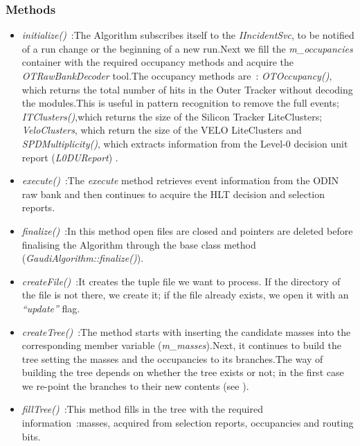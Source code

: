 \subsubsection{\textbf{Methods}}
\begin{itemize}
\item \textit{initialize()}~:The Algorithm subscribes itself to the \textit{IIncidentSvc}, to be notified of a run change or the beginning of a new run.Next we fill the \textit{m\_occupancies} container with the required occupancy methods and acquire the \textit{OTRawBankDecoder} tool.The occupancy methods are~: \textit{OTOccupancy()}, which returns the total number of hits in the Outer Tracker without decoding the modules.This is useful in pattern recognition to remove the full events; \textit{ITClusters()},which returns the size of the Silicon Tracker LiteClusters; \textit{VeloClusters}, which return the size of the VELO LiteClusters and \textit{SPDMultiplicity()}, which extracts information from the Level-0 decision unit report (\textit{L0DUReport}) .\par
\item \textit{execute()}~:The \textit{execute} method retrieves event information from the ODIN raw bank and then continues to acquire the HLT decision and selection reports.\par
\item \textit{finalize()}~:In this method open files are closed and pointers are deleted before finalising the Algorithm through the base class method (\textit{GaudiAlgorithm::finalize()}).\par
\item \textit{createFile()}~:It creates the tuple file we want to process. If the directory of the file is not there, we create it; if the file already exists, we open it with an \textit{``update''} flag.\par
\item \textit{createTree()}~:The method starts with inserting the candidate masses into the corresponding member variable (\textit{m\_masses}).Next, it continues to build the tree setting the masses and the occupancies to its branches.The way of building the tree depends on whether the tree exists or not; in the first case we re-point the branches to their new contents (see \cite{ttree}).\par
\item \textit{fillTree()}~:This method fills in the tree with the required information~:masses, acquired from selection reports, occupancies and routing bits.\par


\end{itemize}


